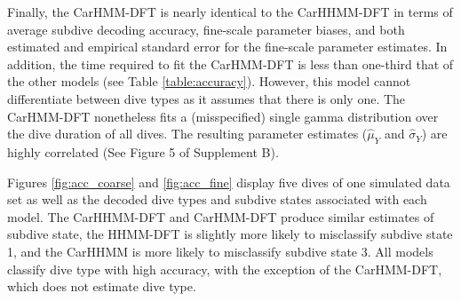 Finally, the CarHMM-DFT is nearly identical to the CarHHMM-DFT in terms of average subdive decoding accuracy, fine-scale parameter biases, and both estimated and empirical standard error for the fine-scale parameter estimates. In addition, the time required to fit the CarHMM-DFT is less than one-third that of the other models (see Table \ref{table:accuracy}). However, this model cannot differentiate between dive types as it assumes that there is only one. The CarHMM-DFT nonetheless fits a (misspecified) single gamma distribution over the dive duration of all dives. The resulting parameter estimates ($\hat \mu_Y$ and $\hat \sigma_Y$) are highly correlated (See Figure 5 of Supplement B).

Figures \ref{fig:acc_coarse} and \ref{fig:acc_fine} display five dives of one simulated data set as well as the decoded dive types and subdive states associated with each model. The CarHHMM-DFT and CarHMM-DFT produce similar estimates of subdive state, the HHMM-DFT is slightly more likely to misclassify subdive state 1, and the CarHHMM is more likely to misclassify subdive state 3. All models classify dive type with high accuracy, with the exception of the CarHMM-DFT, which does not estimate dive type.